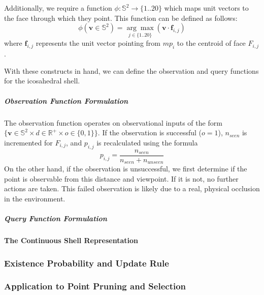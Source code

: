 Additionally, we require a function $\phi:\mathbb{S}^2\rightarrow\{1..20\}$ which maps unit vectors to the face through which they point. This function can be defined as follows:
$$
    \phi(\mathbf{v}\in\mathbb{S}^2) = \underset{j\in\{1..20\}}{\arg\max}(\mathbf{v} \cdot \boldsymbol{f}_{i,j})
$$
where $\boldsymbol{f}_{i,j}$ represents the unit vector pointing from $mp_i$ to the centroid of face $F_{i,j}$.

With these constructs in hand, we can define the observation and query functions for the icosahedral shell.

\subparagraph{Observation Function Formulation}

The observation function operates on observational inputs of the form $\{\boldsymbol{v}\in\mathbb{S}^2\times d\in\mathbb{R}^+\times o\in\{0, 1\}\}$. If the observation is successful ($o = 1$), $n_{seen}$ is incremented for $F_{i,j}$, and $p_{i,j}$ is recalculated using the formula
$$
    p_{i,j}=\frac{n_{seen}}{n_{seen}+n_{unseen}}
$$
On the other hand, if the observation is unsuccessful, we first determine if the point is observable from this distance and viewpoint. If it is not, no further actions are taken. This failed observation is likely due to a real, physical occlusion in the environment.

\subparagraph{Query Function Formulation}

\paragraph{The Continuous Shell Representation}


\subsubsection{Existence Probability and Update Rule}
\label{sec:existence_confidence}

\subsubsection{Application to Point Pruning and Selection}
